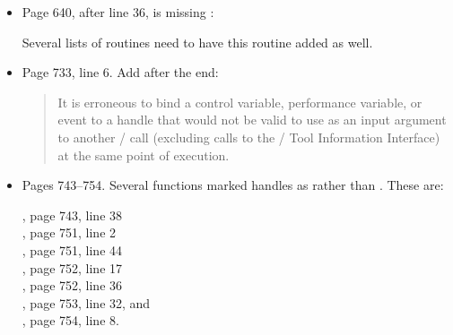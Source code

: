 \begin{itemize}
\begin{quote}
In the unified memory model,  may be used to
order load and store accesses to shared memory and to ensure
visibility of store updates in shared memory
for other threads and \MPI/ processes.

A call to  does not open or close an epoch and
does not complete any pending \RMA/ operations. A call
to  does not
guarantee  of any pending \MPI/ operation.

\end{quote}


\item Page 640, after line 36, is missing :\\

Several lists of routines need to have this routine added as well.

\item Page 733, line 6.  Add after the end:

\begin{quote}
It is erroneous to
bind a control variable, performance variable, or event to a handle that
would not be valid to use as an input argument to another \MPI/ call (excluding
calls to the \MPI/ Tool Information Interface) at the same point of
execution.
\end{quote}


\item Pages 743--754. Several functions marked handles as \IN{} rather
than \INOUT{}. These are:

, page 743, line 38\\
, page 751, line 2\\
, page 751, line 44\\
, page 752, line 17\\
, page 752, line 36\\
, page 753, line 32, and\\
, page 754, line 8.


\end{itemize}
